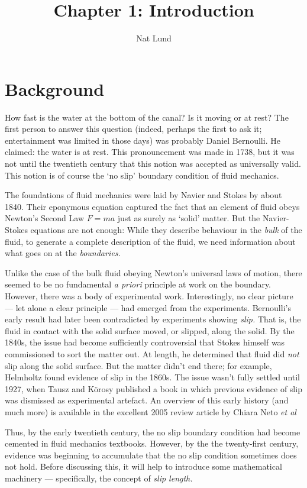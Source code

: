 \documentclass[a4paper]{report}
\author{Nat Lund}
\title{Chapter 1: Introduction}
\begin{document}
\maketitle

\section{Background}

How fast is the water at the bottom of the canal? Is it moving or at rest? The first person to answer this question (indeed, perhaps the first to ask it; entertainment was limited in those days) was probably Daniel Bernoulli. He claimed: the water is at rest. This pronouncement was made in 1738, but it was not until the twentieth century that this notion was accepted as universally valid. This notion is of course the `no slip' boundary condition of fluid mechanics.

The foundations of fluid mechanics were laid by Navier and Stokes by about 1840. Their eponymous equation captured the fact that an element of fluid obeys Newton's Second Law $F=ma$ just as surely as `solid' matter. But the Navier-Stokes equations are not enough: While they describe behaviour in the \emph{bulk} of the fluid, to generate a complete description of the fluid, we need information about what goes on at the \emph{boundaries.}

Unlike the case of the bulk fluid obeying Newton's universal laws of motion, there seemed to be no fundamental \emph{a priori} principle at work on the boundary. However, there was a body of experimental work. Interestingly, no clear picture --- let alone a clear principle --- had emerged from the experiments.  Bernoulli's early result had later been contradicted by experiments showing \emph{slip.} That is, the fluid in contact with the solid surface moved, or slipped, along the solid. By the 1840s, the issue had become sufficiently controversial that Stokes himself was commissioned to sort the matter out. At length, he determined that fluid did \emph{not} slip along the solid surface. But the matter didn't end there; for example, Helmholtz found evidence of slip in the 1860s. The issue wasn't fully settled until 1927, when Tausz and K\"orosy published a book in which previous evidence of slip was dismissed as experimental artefact. An overview of this early history (and much more) is available in the excellent 2005 review article by Chiara Neto \emph{et al} \cite{NetoReview2005} 

Thus, by the early twentieth century, the no slip boundary condition had become cemented in fluid mechanics textbooks. However, by the the twenty-first century, evidence was beginning to accumulate that the no slip condition sometimes does not hold.
Before discussing this, it will help to introduce some mathematical machinery --- specifically, the concept of \emph{slip length.}
\end{document}
